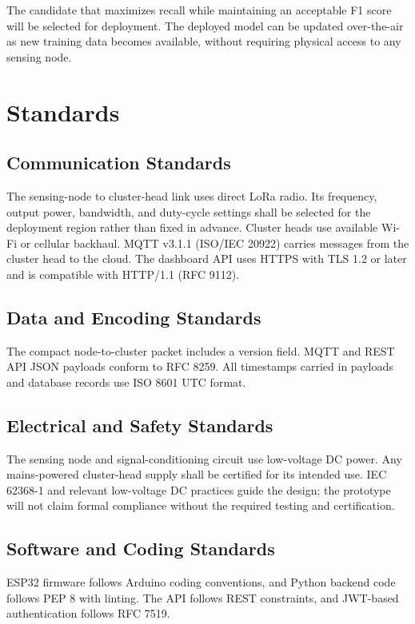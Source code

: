 \documentclass[12pt,a4paper,oneside]{memoir}
\newcommand{\newrevision}[1]{\textcolor{green!45!black}{#1}}
\begin{document}
The candidate that maximizes recall while maintaining an acceptable F1 score will be selected for deployment. The deployed model can be updated over-the-air as new training data becomes available, without requiring physical access to any sensing node.

\section{Standards}

\subsection{Communication Standards}

\newrevision{The sensing-node to cluster-head link uses direct LoRa radio. Its frequency, output power, bandwidth, and duty-cycle settings shall be selected for the deployment region rather than fixed in advance. Cluster heads use available Wi-Fi or cellular backhaul. MQTT v3.1.1 (ISO/IEC 20922) carries messages from the cluster head to the cloud. The dashboard API uses HTTPS with TLS 1.2 or later and is compatible with HTTP/1.1 (RFC 9112).}


\subsection{Data and Encoding Standards}

\newrevision{The compact node-to-cluster packet includes a version field. MQTT and REST API JSON payloads conform to RFC 8259. All timestamps carried in payloads and database records use ISO 8601 UTC format.}

\subsection{Electrical and Safety Standards}

\newrevision{The sensing node and signal-conditioning circuit use low-voltage DC power. Any mains-powered cluster-head supply shall be certified for its intended use. IEC 62368-1 and relevant low-voltage DC practices guide the design; the prototype will not claim formal compliance without the required testing and certification.}

\subsection{Software and Coding Standards}

\newrevision{ESP32 firmware follows Arduino coding conventions, and Python backend code follows PEP 8 with linting. The API follows REST constraints, and JWT-based authentication follows RFC 7519.}
\end{document}
